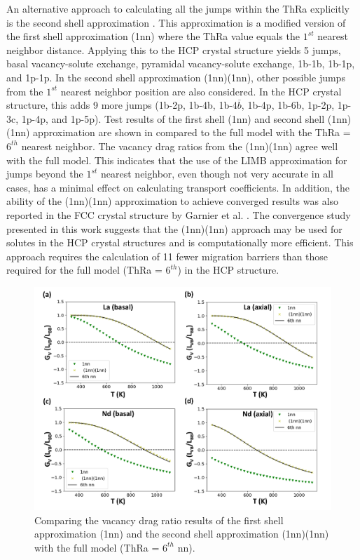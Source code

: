 \documentclass[preprint,12pt]{elsarticle}
\begin{document}
An alternative approach to calculating all the jumps within the ThRa explicitly is the second shell approximation \cite{nastar_mean_2005, garnier_quantitative_2014}. This approximation is a modified version of the first shell approximation (1nn) where the ThRa value equals the $1^{st}$ nearest neighbor distance. Applying this to the HCP crystal structure yields 5 jumps, basal vacancy-solute exchange, pyramidal vacancy-solute exchange, 1b-1b, 1b-1p, and 1p-1p. In the second shell approximation (1nn)(1nn), other possible jumps from the $1^{st}$ nearest neighbor position are also considered. In the HCP crystal structure, this adds 9 more jumps (1b-2p, 1b-4b, 1b-4$\overline{b}$, 1b-4p, 1b-6b, 1p-2p, 1p-3c, 1p-4p, and 1p-5p). Test results of the first shell (1nn) and second shell (1nn)(1nn) approximation are shown in  compared to the full model with the ThRa = $6^{th}$ nearest neighbor. The vacancy drag ratios from the (1nn)(1nn) agree well with the full model. This indicates that the use of the LIMB approximation for jumps beyond the $1^{st}$ nearest neighbor, even though not very accurate in all cases, has a minimal effect on calculating transport coefficients. In addition, the ability of the (1nn)(1nn) approximation to achieve converged results was also reported in the FCC crystal structure by Garnier et al. \cite{garnier_quantitative_2014}. The convergence study presented in this work suggests that the (1nn)(1nn) approach may be used for solutes in the HCP crystal structures and is computationally more efficient. This approach requires the calculation of 11 fewer migration barriers than those required for the full model (ThRa = $6^{th}$) in the HCP structure.

\begin{figure}[h!]
    \centering
    \includegraphics[scale=0.16]{nn_convergence_2nd_shell.jpg}
    \caption{Comparing the vacancy drag ratio results of the first shell approximation (1nn) and the second shell approximation (1nn)(1nn) with the full model (ThRa = $6^{th}$ nn).}
    \label{fig:convergence_2nd_shell}
\end{figure}
\end{document}
